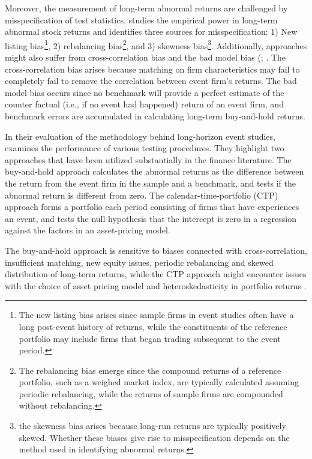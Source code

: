 Moreover, the measurement of long-term abnormal returns are challenged by misspecification of test statistics. \cite{Lyon_1997_test_stats} studies the empirical power in long-term abnormal stock returns and identifies three sources for misspecification: 1) New listing bias\footnote{The new listing bias arises since sample firms in event studies often have a long post-event history of returns, while the constituents of the reference portfolio may include firms that began trading subsequent to the event period.}, 2) rebalancing bias\footnote{The rebalancing bias emerge since the compound returns of a reference portfolio, such as a weighed market index, are typically calculated assuming periodic rebalancing, while the returns of sample firms are compounded without rebalancing. }, and 3) skewness bias\footnote{ the skewness bias arises because long-run returns are typically positively skewed. Whether these biases give rise to misspecification depends on the method used in identifying abnormal returns.}. Additionally, approaches might also suffer from cross-correlation bias and the bad model bias (\citep{fama1998_events}; \citep{mitchell2000managerial}. The cross-correlation bias arises because matching on firm characteristics may fail to completely fail to remove the correlation between event firm's returns. The bad model bias occurs since no benchmark will provide a perfect estimate of the counter factual (i.e., if no event had happened) return of an event firm, and benchmark errors are accumulated in calculating long-term buy-and-hold returns. 

In their evaluation of the methodology behind long-horizon event studies, \cite{Ang_event_method} examines the performance of various testing procedures. They highlight two approaches that have been utilized substantially in the finance literature. The buy-and-hold approach calculates the abnormal returns as the difference between the return from the event firm in the sample and a benchmark, and tests if the abnormal return is different from zero. The calendar-time-portfolio (CTP) approach forms a portfolio each period consisting of firms that have experiences an event, and tests the null hypothesis that the intercept is zero in a regression against the factors in an asset-pricing model.

The buy-and-hold approach is sensitive to biases connected with cross-correlation, insufficient matching, new equity issues, periodic rebalancing and skewed distribution of long-term returns, while the CTP approach might encounter issues with the choice of asset pricing model and heteroskedasticity in portfolio returns \citep{Ang_event_method}.  


